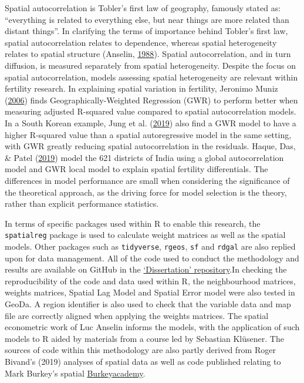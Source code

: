 \documentclass[12pt,twoside]{reedthesis}
\begin{document}
Spatial autocorrelation is Tobler's first law of geography, famously stated as: ``everything is related to everything else, but near things are more related than distant things''. In clarifying the terms of importance behind Tobler's first law, spatial autocorrelation relates to dependence, whereas spatial heterogeneity relates to spatial structure (Anselin, \protect\hyperlink{ref-anselin1988}{1988}). Spatial autocorrelation, and in turn diffusion, is measured separately from spatial heterogeneity. Despite the focus on spatial autocorrelation, models assessing spatial heterogeneity are relevant within fertility research. In explaining spatial variation in fertility, Jeronimo Muniz (\protect\hyperlink{ref-jeronimomuniz2006}{2006}) finds Geographically-Weighted Regression (GWR) to perform better when measuring adjusted R-squared value compared to spatial autocorrelation models. In a South Korean example, Jung et al. (\protect\hyperlink{ref-jung2019}{2019}) also find a GWR model to have a higher R-squared value than a spatial autoregressive model in the same setting, with GWR greatly reducing spatial autocorrelation in the residuals. Haque, Das, \& Patel (\protect\hyperlink{ref-haque2019}{2019}) model the 621 districts of India using a global autocorrelation model and GWR local model to explain spatial fertility differentials. The differences in model performance are small when considering the significance of the theoretical approach, as the driving force for model selection is the theory, rather than explicit performance statistics.

In terms of specific packages used within R to enable this research, the \texttt{spatialreg} package is used to calculate weight matrices as well as the spatial models. Other packages such as \texttt{tidyverse}, \texttt{rgeos}, \texttt{sf} and \texttt{rdgal} are also replied upon for data management. All of the code used to conduct the methodology and results are available on GitHub in the \href{www.github.com/ross-barker-soton.com}{`Dissertation' repository}.In checking the reproducibility of the code and data used within R, the neighbourhood matrices, weights matrices, Spatial Lag Model and Spatial Error model were also tested in GeoDa. A region identifier is also used to check that the variable data and map file are correctly aligned when applying the weights matrices. The spatial econometric work of Luc Anselin informs the models, with the application of such models to R aided by materials from a course led by Sebastian Klüsener. The sources of code within this methodology are also partly derived from Roger Bivand's (2019) analyses of spatial data as well as code published relating to Mark Burkey's spatial \href{http://spatial.burkeyacademy.com/}{Burkeyacademy}.
\end{document}
